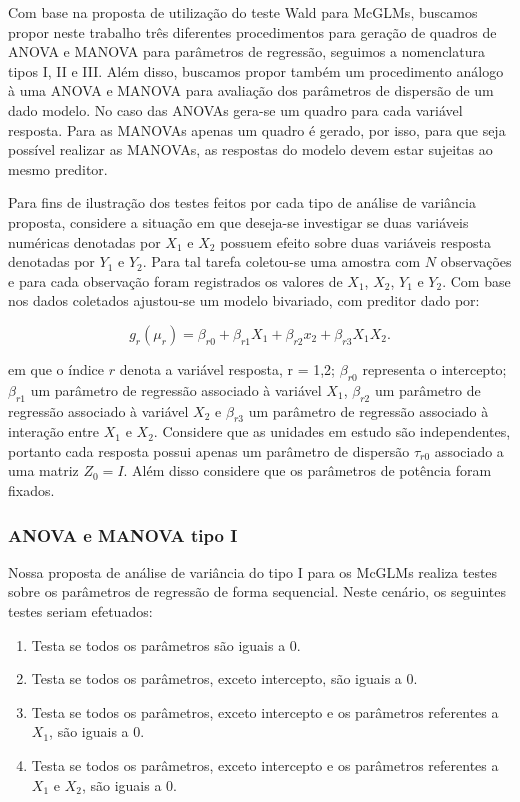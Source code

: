 \documentclass[AMA,STIX1COL]{WileyNJD-v2}
\begin{document}
Com base na proposta de utilização do teste Wald para McGLMs, buscamos propor neste trabalho três diferentes procedimentos para geração de quadros de ANOVA e MANOVA para parâmetros de regressão, seguimos a nomenclatura tipos I, II e III. Além disso, buscamos propor também um procedimento análogo à uma ANOVA e MANOVA para avaliação dos parâmetros de dispersão de um dado modelo. No caso das ANOVAs gera-se um quadro para cada variável resposta. Para as MANOVAs apenas um quadro é gerado, por isso, para que seja possível realizar as MANOVAs, as respostas do modelo devem estar sujeitas ao mesmo preditor.

Para fins de ilustração dos testes feitos por cada tipo de análise de variância proposta, considere a situação em que deseja-se investigar se duas variáveis numéricas denotadas por $X_1$ e $X_2$ possuem efeito sobre duas variáveis resposta denotadas por $Y_1$ e $Y_2$. Para tal tarefa coletou-se uma amostra com $N$ observações e para cada observação foram registrados os valores de $X_1$, $X_2$, $Y_1$ e $Y_2$. Com base nos dados coletados ajustou-se um modelo bivariado, com preditor dado por:

$$
g_r(\mu_r) = \beta_{r0} + \beta_{r1} X_1 + \beta_{r2} x_2 + \beta_{r3} X_1X_2.
$$

\noindent em que o índice $r$ denota a variável resposta, r = 1,2; $\beta_{r0}$ representa o intercepto; $\beta_{r1}$ um parâmetro de regressão associado à variável $X_1$, $\beta_{r2}$ um parâmetro de regressão associado à variável $X_2$ e $\beta_{r3}$ um parâmetro de regressão associado à interação entre $X_1$ e $X_2$. Considere que as unidades em estudo são independentes, portanto cada resposta possui apenas um parâmetro de dispersão $\tau_{r0}$ associado a uma matriz $Z_0 = I$. Além disso considere que os parâmetros de potência foram fixados.

\subsubsection{ANOVA e MANOVA tipo I}

Nossa proposta de análise de variância do tipo I para os McGLMs realiza testes sobre os parâmetros de regressão de forma sequencial. Neste cenário, os seguintes testes seriam efetuados:

\begin{enumerate}
  \item Testa se todos os parâmetros são iguais a 0.
  \item Testa se todos os parâmetros, exceto intercepto, são iguais a 0.
  \item Testa se todos os parâmetros, exceto intercepto e os parâmetros referentes a $X_1$, são iguais a 0.
  \item Testa se todos os parâmetros, exceto intercepto e os parâmetros referentes a $X_1$ e $X_2$, são iguais a 0.
\end{enumerate}
\end{document}
